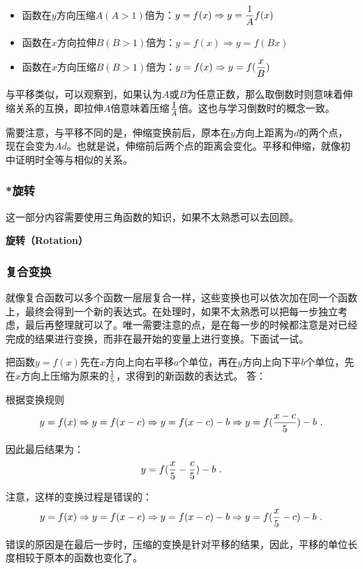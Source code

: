 \begin{itemize}
\item 函数在$y$方向压缩$A(A>1)$倍为：$\displaystyle y=f(x)\Rightarrow y={1\over A}f(x)$
\item 函数在$x$方向拉伸$B(B>1)$倍为：$y=f(x)\Rightarrow y=f(Bx)$
\item 函数在$x$方向压缩$B(B>1)$倍为：$\displaystyle y=f(x)\Rightarrow y=f({x\over B})$
\end{itemize}

与平移类似，可以观察到，如果认为$A$或$B$为任意正数，那么取倒数时则意味着伸缩关系的互换，即拉伸$A$倍意味着压缩$\displaystyle 1\over A$倍。这也与学习倒数时的概念一致。

需要注意，与平移不同的是，伸缩变换前后，原本在$y$方向上距离为$d$的两个点，现在会变为$Ad$。也就是说，伸缩前后两个点的距离会变化。平移和伸缩，就像初中证明时全等与相似的关系。

\subsubsection{*旋转}

这一部分内容需要使用三角函数的知识，如果不太熟悉可以去回顾。

\textbf{旋转（Rotation）}



\subsubsection{复合变换}

就像复合函数可以多个函数一层层复合一样，这些变换也可以依次加在同一个函数上，最终会得到一个新的表达式。在处理时，如果不太熟悉可以把每一步独立考虑，最后再整理就可以了。唯一需要注意的点，是在每一步的时候都注意是对已经完成的结果进行变换，而非在最开始的变量上进行变换。下面试一试。

\begin{exercise}{把函数$y=f(x)$先在$x$方向上向右平移$a$个单位，再在$y$方向上向下平$b$个单位，先在$x$方向上压缩为原来的$1\over5$，求得到的新函数的表达式。}
答：

根据变换规则
$$\displaystyle y=f(x)\Rightarrow y=f(x-c)\Rightarrow y=f(x-c)-b\Rightarrow y=f({{x-c}\over 5})-b~.$$

因此最后结果为：
$$y=f({x\over 5}-{c\over5})-b~.$$

注意，这样的变换过程是错误的：
$$\displaystyle y=f(x)\Rightarrow y=f(x-c)\Rightarrow y=f(x-c)-b\Rightarrow y=f({x\over 5}-c)-b~.$$

错误的原因是在最后一步时，压缩的变换是针对平移的结果，因此，平移的单位长度相较于原本的函数也变化了。

\end{exercise}

